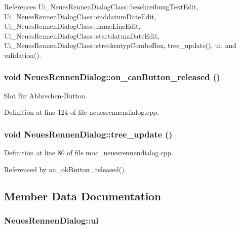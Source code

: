 References Ui\_\-NeuesRennenDialogClass::beschreibungTextEdit, Ui\_\-NeuesRennenDialogClass::enddatumDateEdit, Ui\_\-NeuesRennenDialogClass::nameLineEdit, Ui\_\-NeuesRennenDialogClass::startdatumDateEdit, Ui\_\-NeuesRennenDialogClass::streckentypComboBox, tree\_\-update(), ui, and validation().\hypertarget{class_neues_rennen_dialog_306a748934a817f2ecbe82c52ddbfec1}{
\subsubsection[on\_\-canButton\_\-released]{\setlength{\rightskip}{0pt plus 5cm}void NeuesRennenDialog::on\_\-canButton\_\-released ()}}
\label{class_neues_rennen_dialog_306a748934a817f2ecbe82c52ddbfec1}


Slot für Abbrechen-Button. 



Definition at line 124 of file neuesrennendialog.cpp.\hypertarget{class_neues_rennen_dialog_e4206541c7d04b36eec275243fb60d9c}{
\subsubsection[tree\_\-update]{\setlength{\rightskip}{0pt plus 5cm}void NeuesRennenDialog::tree\_\-update ()}}
\label{class_neues_rennen_dialog_e4206541c7d04b36eec275243fb60d9c}




Definition at line 80 of file moc\_\-neuesrennendialog.cpp.

Referenced by on\_\-okButton\_\-released().

\subsection{Member Data Documentation}
\hypertarget{class_neues_rennen_dialog_d9ee714059009671b3aaf7a94c7d53e2}{
\subsubsection[ui]{ {\bf NeuesRennenDialog::ui}}}
\label{class_neues_rennen_dialog_d9ee714059009671b3aaf7a94c7d53e2}




